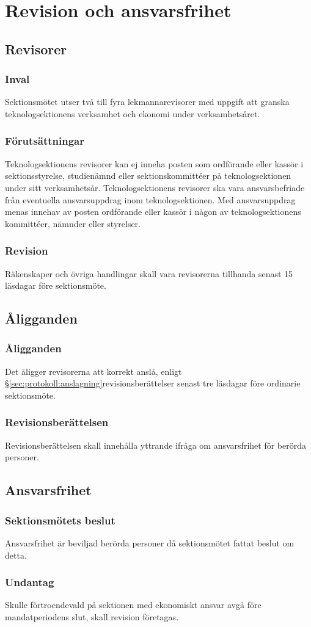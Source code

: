 \section{Revision och ansvarsfrihet}

\subsection{Revisorer}

\subsubsection{Inval}
Sektionsmötet utser två till fyra lekmannarevisorer med uppgift att granska teknologsektionens verksamhet och ekonomi under verksamhetsåret.

\subsubsection{Förutsättningar}
Teknologsektionens revisorer kan ej inneha posten som ordförande eller kassör i sektionsstyrelse, studienämnd eller sektionskommittéer på teknologsektionen under sitt verksamhetsår. Teknologsektionens revisorer ska vara ansvarsbefriade från eventuella ansvarsuppdrag inom teknologsektionen. Med ansvarsuppdrag menas innehav av posten ordförande eller kassör i någon av teknologsektionens kommittéer, nämnder eller styrelser.

\subsubsection{Revision}
Räkenskaper och övriga handlingar skall vara revisorerna tillhanda senast 15 läsdagar före sektionsmöte.

\subsection{Åligganden}

\subsubsection{Åligganden}
Det åligger revisorerna att korrekt anslå, enligt §\ref{sec:protokoll:anslagning}revisionsberättelser senast tre läsdagar före ordinarie sektionsmöte.

\subsubsection{Revisionsberättelsen}
Revisionsberättelsen skall innehålla yttrande ifråga om ansvarsfrihet för berörda personer.

\subsection{Ansvarsfrihet}

\subsubsection{Sektionsmötets beslut}
Ansvarsfrihet är beviljad berörda personer då sektionsmötet fattat beslut om detta.

\subsubsection{Undantag}
Skulle förtroendevald på sektionen med ekonomiskt ansvar avgå före mandatperiodens slut, skall revision företagas.
